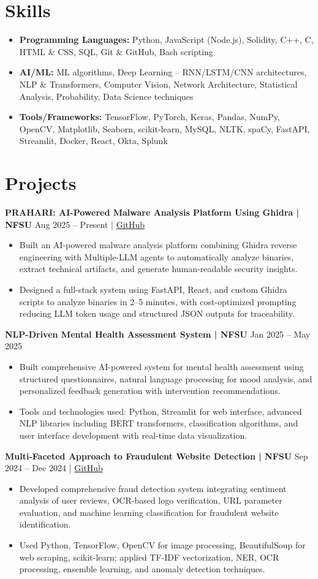 \documentclass[a4paper,10pt]{article}
\newcommand{\resumeItem}[2]{\item{\textbf{#1}{\hspace{0.5mm}#2}}}
\newcommand{\resumeSubItem}[2]{\resumeItem{#1}{#2}\vspace{-2pt}}
\newcommand{\resumeHeadingSkillStart}{\begin{itemize}[leftmargin=*,itemsep=1.5mm, rightmargin=2ex]}
\newcommand{\resumeItemListStart}{\begin{itemize}[leftmargin=*,labelsep=1mm,itemsep=0pt,topsep=2pt]}
\newcommand{\resumeHeadingSkillEnd}{\end{itemize}\vspace{-2mm}}
\newcommand{\resumeItemListEnd}{\end{itemize}\vspace{1mm}}
\begin{document}
\section{\textbf{Skills}}
\resumeHeadingSkillStart
\resumeSubItem{Programming Languages: }{Python, JavaScript (Node.js), Solidity, C++, C, HTML \& CSS, SQL, Git \& GitHub, Bash scripting}

\resumeSubItem{AI/ML: }{ML algorithms, Deep Learning – RNN/LSTM/CNN architectures, NLP \& Transformers, Computer Vision, Network Architecture, Statistical Analysis, Probability, Data Science techniques}

\resumeSubItem{Tools/Frameworks: }{TensorFlow, PyTorch, Keras, Pandas, NumPy, OpenCV, Matplotlib, Seaborn, scikit-learn, MySQL, NLTK, spaCy, FastAPI, Streamlit, Docker, React, Okta, Splunk}
\resumeHeadingSkillEnd

\section{\textbf{Projects}}
\textbf{PRAHARI: AI-Powered Malware Analysis Platform Using Ghidra | NFSU} \hfill Aug 2025 -- Present |
\href{https://github.com/MIHIR-RANJAN/PRAHARI-AI-POWERED-MALWARE-ANALYSIS-PLATFORM-USING-GHIDRA.git}{GitHub}
\resumeItemListStart
\item Built an AI-powered malware analysis platform combining Ghidra reverse engineering with Multiple-LLM agents to automatically analyze binaries, extract technical artifacts, and generate human-readable security insights.
\item Designed a full-stack system using FastAPI, React, and custom Ghidra scripts to analyze binaries in 2--5 minutes, with cost-optimized prompting reducing LLM token usage and structured JSON outputs for traceability.
\resumeItemListEnd


\textbf{NLP-Driven Mental Health Assessment System | NFSU} \hfill Jan 2025 -- May 2025
\resumeItemListStart
\item Built comprehensive AI-powered system for mental health assessment using structured questionnaires, natural language processing for mood analysis, and personalized feedback generation with intervention recommendations.
\item Tools and technologies used: Python, Streamlit for web interface, advanced NLP libraries including BERT transformers, classification algorithms, and user interface development with real-time data visualization.
\resumeItemListEnd

\textbf{Multi-Faceted Approach to Fraudulent Website Detection | NFSU} \hfill Sep 2024 -- Dec 2024 | \href{https://github.com/MIHIR-RANJAN/A_Multi_Faceted_Approach_to_Fraudulent_Website_Detection.git}{GitHub}
\resumeItemListStart
\item Developed comprehensive fraud detection system integrating sentiment analysis of user reviews, OCR-based logo verification, URL parameter evaluation, and machine learning classification for fraudulent website identification.
\item Used Python, TensorFlow, OpenCV for image processing, BeautifulSoup for web scraping, scikit-learn; applied TF-IDF vectorization, NER, OCR processing, ensemble learning, and anomaly detection techniques.
\resumeItemListEnd
\end{document}
